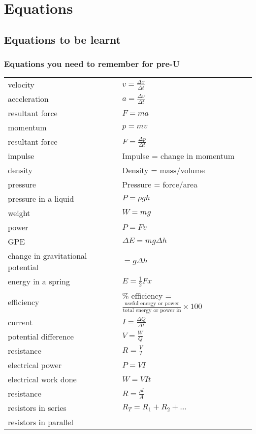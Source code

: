 \documentclass[revision-guide.tex]{subfiles}
\begin{document}
\chapter{Equations}
\setlength{\LTleft}{0pt}

\section{Equations to be learnt}
\subsection{Equations you need to remember for pre-U}

\renewcommand*{\arraystretch}{2}
\begin{longtable}{ll}
velocity & $v= \frac{\Delta x}{\Delta t}$ \\
acceleration & $a= \frac{\Delta v}{\Delta t}$ \\
resultant force & $F=ma$ \\
momentum & $p=mv$ \\
resultant force & $F=\frac{\Delta p}{\Delta t}$ \\
impulse & Impulse = change in momentum \\
density & Density = mass/volume \\
pressure & Pressure = force/area \\
pressure in a liquid & $P = \rho gh$ \\
weight & $W = mg$ \\
power & $P = Fv$ \\
GPE & $\Delta E = mg \Delta h$ \\
change in gravitational potential & $=g \Delta h $ \\
energy in a spring & $E = \frac{1}{2} Fx$ \\
efficiency & \% efficiency =
$\frac{\text{useful energy or power}}{\text{total energy or power in}}
\times 100$ \\
current & $I = \frac{\Delta Q}{\Delta t}$ \\
potential difference & $V = \frac{W}{Q}$ \\
resistance & $R = \frac{V}{I}$ \\
electrical power & $P = VI$ \\
electrical work done & $W = VIt$\\
resistance & $R = \frac{\rho l}{A}$ \\
resistors in series & $R_T = R_1 + R_2 + \ldots{}$\\
resistors in parallel &

\end{longtable}
\end{document}
